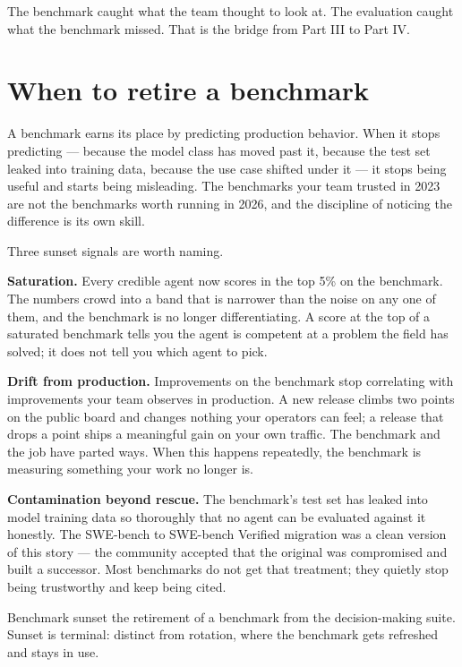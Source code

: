 The benchmark caught what the team thought to look at. The evaluation caught what the benchmark missed. That is the bridge from Part III to Part IV.

\section{When to retire a benchmark}

A benchmark earns its place by predicting production behavior. When it stops predicting --- because the model class has moved past it, because the test set leaked into training data, because the use case shifted under it --- it stops being useful and starts being misleading. The benchmarks your team trusted in 2023 are not the benchmarks worth running in 2026, and the discipline of noticing the difference is its own skill.

Three sunset signals are worth naming.

\textbf{Saturation.} Every credible agent now scores in the top 5\% on the benchmark. The numbers crowd into a band that is narrower than the noise on any one of them, and the benchmark is no longer differentiating. A score at the top of a saturated benchmark tells you the agent is competent at a problem the field has solved; it does not tell you which agent to pick.

\textbf{Drift from production.} Improvements on the benchmark stop correlating with improvements your team observes in production. A new release climbs two points on the public board and changes nothing your operators can feel; a release that drops a point ships a meaningful gain on your own traffic. The benchmark and the job have parted ways. When this happens repeatedly, the benchmark is measuring something your work no longer is.

\textbf{Contamination beyond rescue.} The benchmark's test set has leaked into model training data so thoroughly that no agent can be evaluated against it honestly. The SWE-bench to SWE-bench Verified migration was a clean version of this story --- the community accepted that the original was compromised and built a successor. Most benchmarks do not get that treatment; they quietly stop being trustworthy and keep being cited.

\begin{TNdefinition}{Benchmark sunset} the retirement of a benchmark from the decision-making suite. Sunset is terminal: distinct from rotation, where the benchmark gets refreshed and stays in use. \end{TNdefinition}

